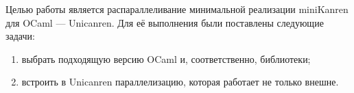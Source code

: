 
\label{sec:task}
 Целью работы является распараллеливание минимальной реализации miniKanren для OCaml --- Unicanren. Для её выполнения были поставлены следующие задачи:
 \begin{enumerate}
 \item  выбрать подходящую версию OCaml и, соответственно, библиотеки;
 \item  встроить в Unicanren параллелизацию, которая работает не только внешне.
\end{enumerate}

